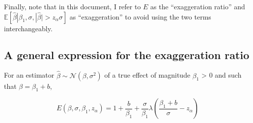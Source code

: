 \documentclass[a4paper, 11pt]{report}
\begin{document}
			Finally, note that in this document, I refer to $E$ as the ``exaggeration ratio'' and $\mathbb{E}\left[ \hat{\beta} | \beta_{1}, \sigma, | \hat{\beta} | > z_{\alpha} \sigma \right]$ as ``exaggeration'' to avoid using the two terms interchangeably.
			
		 \subsection{A general expression for the exaggeration ratio}
			
			\begin{lemma}\label{lemma_exagg}
		 		For an estimator $\hat{\beta} \sim \mathcal{N}(\beta, \sigma^{2})$ of a true effect of magnitude $\beta_1$ > 0 and such that $\beta = \beta_{1} + b$,
		 
				 \begin{equation}\label{exagg_general}
				 	E(\beta, \sigma, \beta_{1}, z_{\alpha}) =  1 + \dfrac{b}{\beta_{1}}+ \dfrac{\sigma}{\beta_1} \lambda\left( \dfrac{\beta_{1} + b}{\sigma} - z_{\alpha} \right) 
				\end{equation}
			\end{lemma}
			
\end{document}
